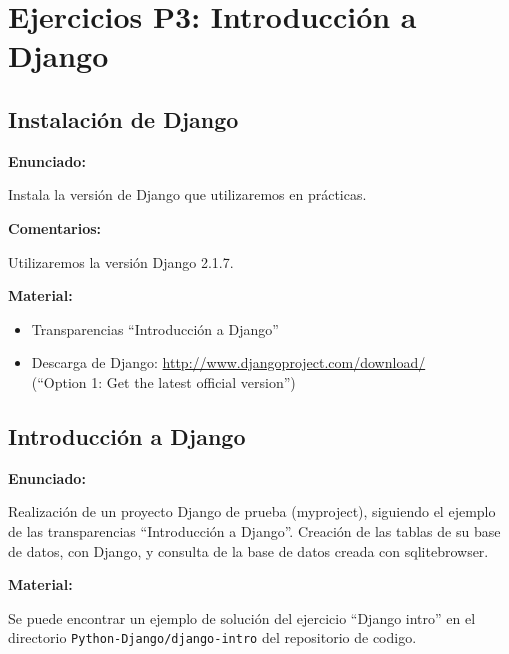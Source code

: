 \section{Ejercicios P3: Introducción a Django}

\subsection{Instalación de Django}
\label{subsec:django-install}

\textbf{Enunciado:}

Instala la versión de Django que utilizaremos en prácticas.

\textbf{Comentarios:}

Utilizaremos la versión Django 2.1.7.

\textbf{Material:}

\begin{itemize}
\item Transparencias ``Introducción a Django''
\item Descarga de Django: \url{http://www.djangoproject.com/download/} \\
  (``Option 1: Get the latest official version'')
\end{itemize}


\subsection{Introducción a Django}
\label{subsec:django-intro}

\textbf{Enunciado:}

Realización de un proyecto Django de prueba (myproject), siguiendo el ejemplo de las transparencias ``Introducción a Django''. Creación de las tablas de su base de datos, con Django, y consulta de la base de datos creada con sqlitebrowser.

\textbf{Material:}

Se puede encontrar un ejemplo de solución del ejercicio ``Django intro'' en el directorio \verb|Python-Django/django-intro| del repositorio de codigo.

